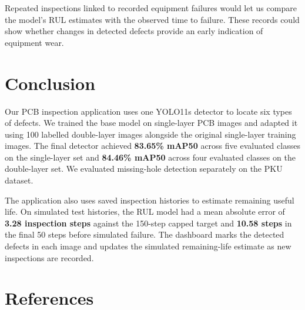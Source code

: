 \documentclass[conference]{IEEEtran}
\begin{document}
Repeated inspections linked to recorded equipment failures would let us compare the model’s RUL estimates with the observed time to failure. These records could show whether changes in detected defects provide an early indication of equipment wear.

\section{Conclusion}

Our PCB inspection application uses one YOLO11s detector to locate six types of defects. We trained the base model on single-layer PCB images and adapted it using 100 labelled double-layer images alongside the original single-layer training images. The final detector achieved \textbf{83.65\% mAP50} across five evaluated classes on the single-layer set and \textbf{84.46\% mAP50} across four evaluated classes on the double-layer set. We evaluated missing-hole detection separately on the PKU dataset.

The application also uses saved inspection histories to estimate remaining useful life. On simulated test histories, the RUL model had a mean absolute error of \textbf{3.28 inspection steps} against the 150-step capped target and \textbf{10.58 steps} in the final 50 steps before simulated failure. The dashboard marks the detected defects in each image and updates the simulated remaining-life estimate as new inspections are recorded.

\FloatBarrier

\section*{References}
\end{document}
